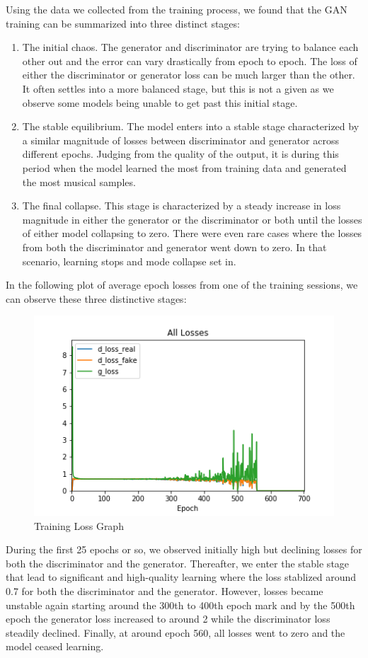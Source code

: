 \documentclass[12pt,oneside]{chicagocapstone}
\providecommand{\tightlist}{%
  \setlength{\itemsep}{0pt}\setlength{\parskip}{0pt}}
\begin{document}
Using the data we collected from the training process, we found that the GAN training can be summarized into three distinct stages:
\begin{enumerate}
\def\labelenumi{\arabic{enumi}.}
\tightlist
\item
  The initial chaos. The generator and discriminator are trying to balance each other out and the error can vary drastically from epoch to epoch. The loss of either the discriminator or generator loss can be much larger than the other. It often settles into a more balanced stage, but this is not a given as we observe some models being unable to get past this initial stage.
\item
  The stable equilibrium. The model enters into a stable stage characterized by a similar magnitude of losses between discriminator and generator across different epochs. Judging from the quality of the output, it is during this period when the model learned the most from training data and generated the most musical samples.
\item
  The final collapse. This stage is characterized by a steady increase in loss magnitude in either the generator or the discriminator or both until the losses of either model collapsing to zero. There were even rare cases where the losses from both the discriminator and generator went down to zero. In that scenario, learning stops and mode collapse set in.
\end{enumerate}
In the following plot of average epoch losses from one of the training sessions, we can observe these three distinctive stages:
\begin{figure}

{\centering \includegraphics[width=0.8\linewidth]{figure/all_losses_1} 

}

\caption{Training Loss Graph}\label{fig:unnamed-chunk-8}
\end{figure}
During the first 25 epochs or so, we observed initially high but declining losses for both the discriminator and the generator. Thereafter, we enter the stable stage that lead to significant and high-quality learning where the loss stablized around 0.7 for both the discriminator and the generator. However, losses became unstable again starting around the 300th to 400th epoch mark and by the 500th epoch the generator loss increased to around 2 while the discriminator loss steadily declined. Finally, at around epoch 560, all losses went to zero and the model ceased learning.
\end{document}
